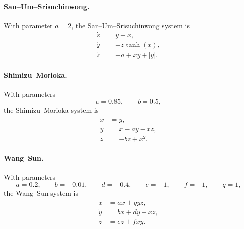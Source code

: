 \paragraph{San--Um--Srisuchinwong.}
With parameter \(a=2\), the San--Um--Srisuchinwong system is
\begin{equation}
\begin{aligned}
  \dot x &= y-x,\\
  \dot y &= -z\tanh(x),\\
  \dot z &= -a+xy+|y| .
\end{aligned}
\label{eq:app_dysts_san_um_srisuchinwong}
\end{equation}

\paragraph{Shimizu--Morioka.}
With parameters
\[
  a=0.85,\qquad b=0.5,
\]
the Shimizu--Morioka system is
\begin{equation}
\begin{aligned}
  \dot x &= y,\\
  \dot y &= x-ay-xz,\\
  \dot z &= -bz+x^2 .
\end{aligned}
\label{eq:app_dysts_shimizu_morioka}
\end{equation}

\paragraph{Wang--Sun.}
With parameters
\[
  a=0.2,\qquad b=-0.01,\qquad d=-0.4,\qquad
  e=-1,\qquad f=-1,\qquad q=1,
\]
the Wang--Sun system is
\begin{equation}
\begin{aligned}
  \dot x &= ax+qyz,\\
  \dot y &= bx+dy-xz,\\
  \dot z &= ez+fxy .
\end{aligned}
\label{eq:app_dysts_wang_sun}
\end{equation}
